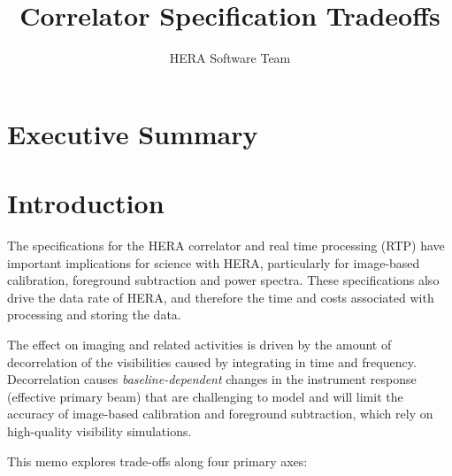 \documentclass{article}
\begin{document}
\author{HERA Software Team}
\title{Correlator Specification Tradeoffs}
\maketitle

\setcounter{section}{-1}
\section*{Executive Summary}

\newpage

\section*{Introduction}
The specifications for the HERA correlator and real time processing (RTP) have important implications for science with HERA, 
particularly for image-based calibration, foreground subtraction and power spectra. 
These specifications also drive the data rate of HERA, and therefore the time and costs associated with processing and storing the data.

The effect on imaging and related activities is driven by the amount of decorrelation of the visibilities caused by integrating in time and frequency. 
Decorrelation causes \textit{baseline-dependent} changes in the instrument response (effective primary beam) that are challenging to model and will 
limit the accuracy of image-based calibration and foreground subtraction, which rely on high-quality visibility simulations. 

This memo explores trade-offs along four primary axes:
\end{document}
